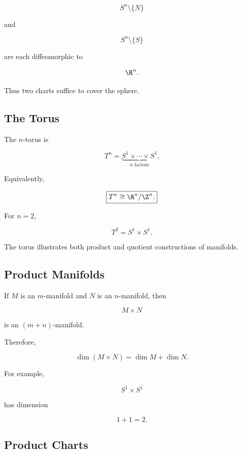 \[
S^n\setminus\{N\}
\]

and

\[
S^n\setminus\{S\}
\]

are each diffeomorphic to

\[
\R^n.
\]

Thus two charts suffice to cover the sphere.

\subsection{The Torus}
\label{subsec:torus-manifold}

The \(n\)-torus is

\[
\boxed{
T^n
=
\underbrace{
S^1\times\cdots\times S^1
}_{n\text{ factors}}.
}
\]

Equivalently,

\[
\boxed{
T^n
\cong
\R^n/\Z^n.
}
\]

For \(n=2\),

\[
T^2=S^1\times S^1.
\]

The torus illustrates both product and quotient constructions of manifolds.

\subsection{Product Manifolds}
\label{subsec:product-manifolds}

If \(M\) is an \(m\)-manifold and \(N\) is an \(n\)-manifold, then

\[
\boxed{
M\times N
}
\]

is an \((m+n)\)-manifold.

Therefore,

\[
\boxed{
\dim(M\times N)
=
\dim M+\dim N.
}
\]

For example,

\[
S^1\times S^1
\]

has dimension

\[
1+1=2.
\]

\subsection{Product Charts}
\label{subsec:product-charts}

